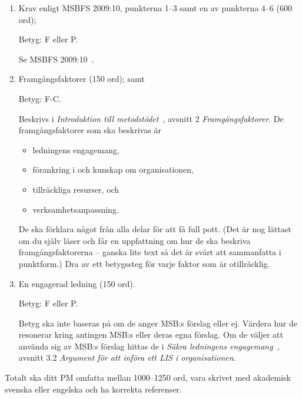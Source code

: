 \documentclass[a4paper]{llncs}
\begin{document}
\begin{enumerate}
  \item Krav enligt MSBFS 2009:10, punkterna 1--3 samt en av punkterna 4--6 (600 
    ord);
    \begin{solution}
      Betyg: F eller P.

      Se MSBFS 2009:10~\cite{MSBFS2009:10}.
    \end{solution}

  \item Framgångsfaktorer (150 ord); samt
    \begin{solution}
      Betyg: F-C.

      Beskrivs i \emph{Introduktion till metodstödet}~\cite{MSB2011itm}, avsnitt 
      2 \emph{Framgångsfaktorer}.
      De framgångsfaktorer som ska beskrivas är
      \begin{itemize}
        \item ledningens engagemang,
        \item förankring i och kunskap om organisationen,
        \item tillräckliga resurser, och
        \item verksamhetsanpassning.
      \end{itemize}

      De ska förklara något från alla delar för att få full pott.
      (Det är nog lättast om du själv läser och får en uppfattning om hur de 
      ska beskriva framgångsfaktorerna -- ganska lite text så det är svårt att 
      sammanfatta i punktform.)
      Dra av ett betygssteg för varje faktor som är otillräcklig.
    \end{solution}

  \item En engagerad ledning (150 ord).
    \begin{solution}
      Betyg: F eller P.

      Betyg ska inte baseras på om de anger MSB:s förslag eller ej.
      Värdera hur de resonerar kring antingen MSB:s eller deras egna förslag.
      Om de väljer att använda sig av MSB:s förslag hittas de i \emph{Säkra 
        ledningens engagemang}~\cite{MSB2011sle}, avsnitt 3.2 \emph{Argument 
        för att införa ett LIS i organisationen}.
    \end{solution}
\end{enumerate}

Totalt ska ditt PM omfatta mellan 1000--1250 ord, vara skrivet med akademisk 
svenska eller engelska och ha korrekta referenser.


\printbibliography{}
\end{document}
